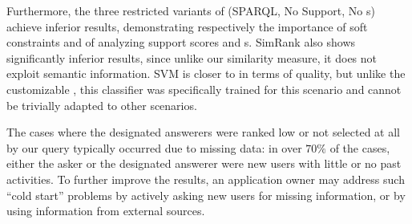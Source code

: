 Furthermore, the three restricted
variants of \qlang{} (SPARQL, No Support, No \Fset{}s) achieve
inferior results, demonstrating respectively the importance of soft
constraints and of analyzing support scores and \fset{}s. 
SimRank also shows significantly inferior results, since unlike our similarity measure, it does not exploit semantic information. SVM is
closer to \qlang{} in terms of quality, but unlike the customizable \qlang{}, this classifier
was specifically trained for this scenario and cannot be trivially adapted to other scenarios.



The cases
where the designated answerers were ranked low or not
selected at all by our query typically occurred due to missing
data: in over $70\%$ of the cases, either the asker or the designated answerer were new users with
little or no past activities. To further improve the results, an application owner may address such ``cold start'' problems by actively asking new
users for missing information, or by using information from
external sources.  %




